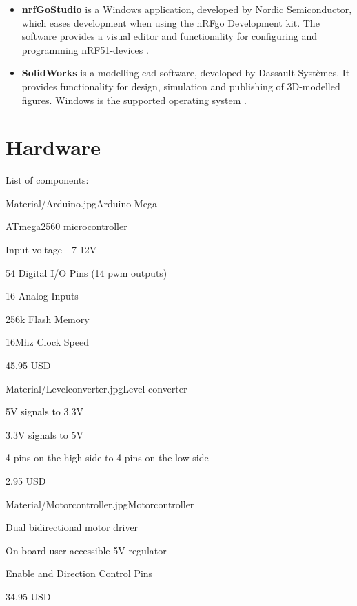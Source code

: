 \begin{itemize}
    \item \textbf{nrfGoStudio} is a Windows application, developed by Nordic Semiconductor, which eases development when using the nRFgo Development kit. The software provides a visual editor and functionality for configuring and programming nRF51-devices \cite{nrfgo}.
    \item \textbf{SolidWorks} is a modelling \acrshort{cad} software, developed by Dassault Systèmes. It provides functionality for design, simulation and publishing of 3D-modelled figures. Windows is the supported operating system \cite{solidworks}.
\end{itemize}


\section{Hardware}
\label{sec:hardware}
List of components:
\begin{material}{Material/Arduino.jpg}{Arduino Mega}
\item ATmega2560 microcontroller
\item Input voltage - 7-12V
\item 54 Digital I/O Pins (14 \acrfull{pwm} outputs)
\item 16 Analog Inputs
\item 256k Flash Memory
\item 16Mhz Clock Speed
\item 45.95 USD
\end{material}

\begin{material}{Material/Levelconverter.jpg}{Level converter}
\item 5V signals to 3.3V 
\item 3.3V signals to 5V
\item 4 pins on the high side to 4 pins on the low side
\item 2.95 USD
\end{material}

\newpage
{}
\begin{material}{Material/Motorcontroller.jpg}{Motorcontroller}
\item Dual bidirectional motor driver
\item On-board user-accessible 5V regulator 
\item Enable and Direction Control Pins
\item 34.95 USD
\end{material}

